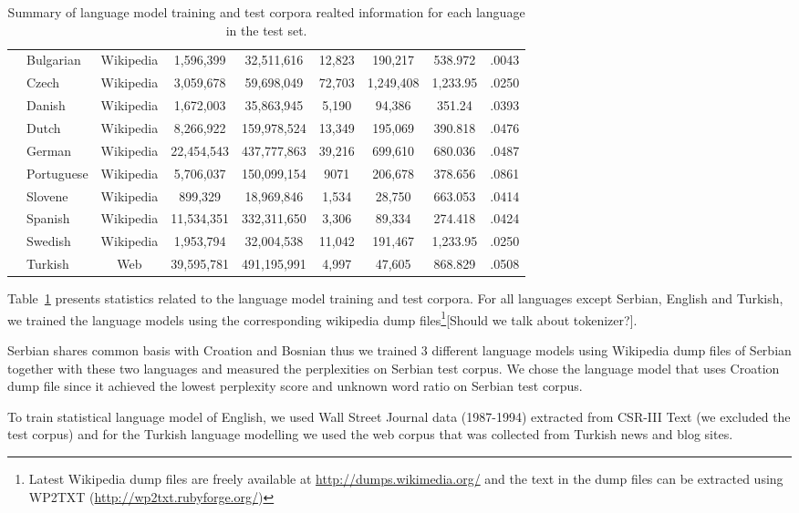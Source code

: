 \begin{table}[h]
\begin{tabular}{l|l|c|c|c|c|c|c|c|}
    &Bulgarian& Wikipedia &1,596,399 & 32,511,616  & 12,823 & 190,217 & 538.972 & .0043\\
    &Czech & Wikipedia &3,059,678 & 59,698,049 & 72,703 & 1,249,408 & 1,233.95 &.0250\\
    &Danish & Wikipedia &1,672,003 & 35,863,945 & 5,190 & 94,386 & 351.24 & .0393\\
    &Dutch & Wikipedia &8,266,922 & 159,978,524 & 13,349 & 195,069 & 390.818 & .0476\\
    &German & Wikipedia &22,454,543&437,777,863 & 39,216 & 699,610 & 680.036 & .0487\\
    &Portuguese & Wikipedia & 5,706,037 & 150,099,154 & 9071 & 206,678 & 378.656 & .0861\\
    &Slovene & Wikipedia & 899,329 & 18,969,846 & 1,534 & 28,750 & 663.053 & .0414\\
    &Spanish & Wikipedia &11,534,351 & 332,311,650& 3,306 & 89,334 & 274.418 & .0424\\
    &Swedish & Wikipedia &1,953,794 & 32,004,538& 11,042 & 191,467 & 1,233.95 & .0250\\
    &Turkish & Web &39,595,781 & 491,195,991& 4,997 & 47,605 & 868.829 & .0508\\
    \hline
  \end{tabular}
  \caption{Summary of language model training and test corpora
  realted information for each language in the test set.}
  \label{tab:lmstatistics}
\end{table}

\noindent Table~\ref{tab:lmstatistics} presents statistics related to the
language model training and test corpora.  For all languages except
Serbian, English and Turkish, we trained the language models using the
corresponding wikipedia dump files\footnote{Latest Wikipedia dump
files are freely available at \url{http://dumps.wikimedia.org/} and
the text in the dump files can be extracted using WP2TXT
(\url{http://wp2txt.rubyforge.org/})}[Should we talk about tokenizer?].

Serbian shares common basis with Croation and Bosnian thus we trained
3 different language models using Wikipedia dump files of Serbian
together with these two languages and measured the perplexities on
Serbian test corpus.  We chose the language model that uses Croation
dump file since it achieved the lowest perplexity score and unknown
word ratio on Serbian test corpus.

To train statistical language model of English, we used Wall Street
Journal data (1987-1994) extracted from CSR-III Text \cite{csr3text}
(we excluded the test corpus) and for the Turkish language modelling
we used the web corpus that was collected from Turkish news and blog
sites\cite{sak2008turkish}.  

